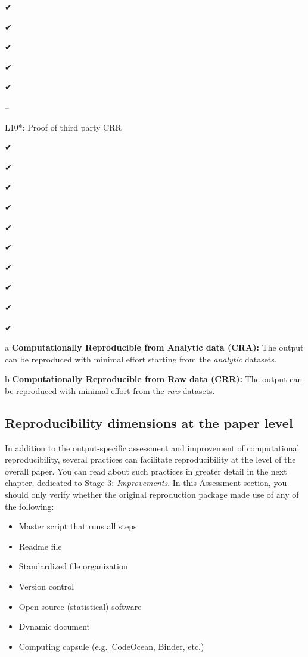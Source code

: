 \documentclass[]{book}
\providecommand{\tightlist}{%
  \setlength{\itemsep}{0pt}\setlength{\parskip}{0pt}}
\begin{document}
✔

✔

✔

✔

✔

--

L10*: Proof of third party CRR

✔

✔

✔

✔

✔

✔

✔

✔

✔

✔

a \textbf{Computationally Reproducible from Analytic data (CRA):} The output can be reproduced with minimal effort starting from the \emph{analytic} datasets.

b \textbf{Computationally Reproducible from Raw data (CRR):} The output can be reproduced with minimal effort from the \emph{raw} datasets.

\hypertarget{reproducibility-dimensions-at-the-paper-level}{%
\subsection{Reproducibility dimensions at the paper level}\label{reproducibility-dimensions-at-the-paper-level}}

In addition to the output-specific assessment and improvement of computational reproducibility, several practices can facilitate reproducibility at the level of the overall paper. You can read about such practices in greater detail in the next chapter, dedicated to Stage 3: \emph{Improvements}. In this Assessment section, you should only verify whether the original reproduction package made use of any of the following:

\begin{itemize}
\tightlist
\item
  Master script that runs all steps
\item
  Readme file
\item
  Standardized file organization\\
\item
  Version control
\item
  Open source (statistical) software\\
\item
  Dynamic document\\
\item
  Computing capsule (e.g.~CodeOcean, Binder, etc.)
\end{itemize}
\end{document}
